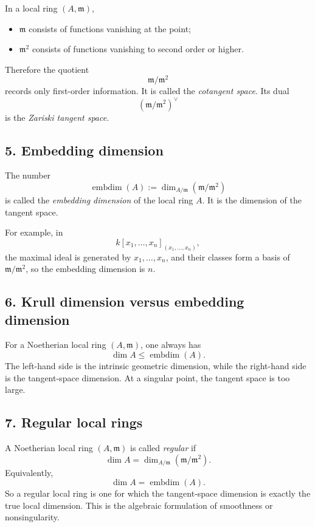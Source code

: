 \documentclass[12pt,a4paper]{article}
\theoremstyle{plain}
\theoremstyle{definition}      %
\begin{document}
	In a local ring \((A,\mathfrak m)\),
	\begin{itemize}
		\item \(\mathfrak m\) consists of functions vanishing at the point;
		\item \(\mathfrak m^2\) consists of functions vanishing to second order or higher.
	\end{itemize}
	Therefore the quotient
	\[
	\mathfrak m/\mathfrak m^2
	\]
	records only first-order information. It is called the \emph{cotangent space}. Its dual
	\[
	(\mathfrak m/\mathfrak m^2)^\vee
	\]
	is the \emph{Zariski tangent space}.
	
	\subsection*{5. Embedding dimension}
	
	The number
	\[
	\operatorname{embdim}(A):=\dim_{A/\mathfrak m}(\mathfrak m/\mathfrak m^2)
	\]
	is called the \emph{embedding dimension} of the local ring \(A\). It is the dimension of the tangent space.
	
	For example, in
	\[
	k[x_1,\dots,x_n]_{(x_1,\dots,x_n)},
	\]
	the maximal ideal is generated by \(x_1,\dots,x_n\), and their classes form a basis of \(\mathfrak m/\mathfrak m^2\), so the embedding dimension is \(n\).
	
	\subsection*{6. Krull dimension versus embedding dimension}
	
	For a Noetherian local ring \((A,\mathfrak m)\), one always has
	\[
	\dim A \le \operatorname{embdim}(A).
	\]
	The left-hand side is the intrinsic geometric dimension, while the right-hand side is the tangent-space dimension. At a singular point, the tangent space is too large.
	
	\subsection*{7. Regular local rings}
	
	A Noetherian local ring \((A,\mathfrak m)\) is called \emph{regular} if
	\[
	\dim A=\dim_{A/\mathfrak m}(\mathfrak m/\mathfrak m^2).
	\]
	Equivalently,
	\[
	\dim A=\operatorname{embdim}(A).
	\]
	So a regular local ring is one for which the tangent-space dimension is exactly the true local dimension. This is the algebraic formulation of smoothness or nonsingularity.
	
\end{document}
